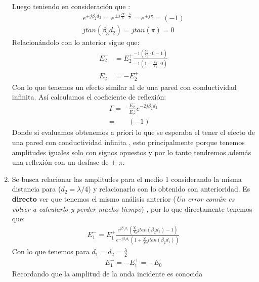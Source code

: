 \documentclass[
  11pt,
  letterpaper,
   addpoints,
   answers
  ]{exam}
\begin{document}
\begin{questions}
\begin{solution}
\begin{enumerate}
\begin{align}
            \end{align}
            Luego teniendo en consideración que :
            \begin{align}
                e^{\pm j\beta_{2}d_{2}} =  e^{\pm j \frac{2\pi}{\lambda} \cdot \frac{\lambda}{2}} = e^{\pm j \pi} = (-1)\\
                jtan(\beta_{3} d_{2}) = jtan(\pi) = 0
            \end{align}
            Relacionándolo con lo anterior sigue que:
            \begin{align}
                E_{2}^{-} &= E_{2}^{+} \frac{-1 \left( \frac{Y_{2}}{Y_{3}} \cdot 0 - 1\right)}{ -1 \left( 1+ \frac{Y_{2}}{Y_{3}} \cdot 0\right)}\\
                E_{2}^{-} &= - E_{2}^{+}
            \end{align}
            Con lo que tenemos un efecto similar al de una pared con conductividad infinita. Así calculamos el coeficiente de reflexión:
            \begin{align}
                \Gamma =& \frac{E_{2}^{-}}{E_{2}^{+}} e^{-2j\beta_{2}d_{2} }\\
                       =& (-1)
            \end{align}
            Donde si evaluamos obtenemos a priori lo que se esperaba el tener el efecto de una pared con conductividad infinita , esto principalmente porque tenemos amplitudes iguales solo con signos opuestos y por lo tanto tendremos además una reflexión con un desfase de $\pm$ $\pi$.
            \item Se busca relacionar las amplitudes para el medio 1 considerando la misma distancia para ($d_{2} = \lambda/4$) y relacionarlo con lo obtenido con anterioridad. Es \textbf{directo} ver que tenemos el mismo análisis anterior (\textit{Un error común es volver a calcularlo y perder mucho tiempo}) , por lo que directamente tenemos que:
            \begin{align}
                E_{1}^{-} = E_{1}^{+} \frac{e^{j\beta_{1}d_{1}} \left( \frac{Y_{1}}{Y_{2}} jtan(\beta_{2}d_{1}) -1\right)}{ e^{-j\beta_{1}d_{1}} \left( 1+ \frac{Y_{1}}{Y_{2}} j tan(\beta_{2}d_{1})\right)}
            \end{align}
            Con lo que tenemos para $d_{1} = d_{2} = \frac{\lambda}{2}$
            \begin{align}
                E_{1}^{-} = - E_{1}^{+} = - E_{0} 
            \end{align}
            Recordando que la amplitud de la onda incidente es conocida

\end{enumerate}
\end{solution}
\end{questions}
\end{document}
